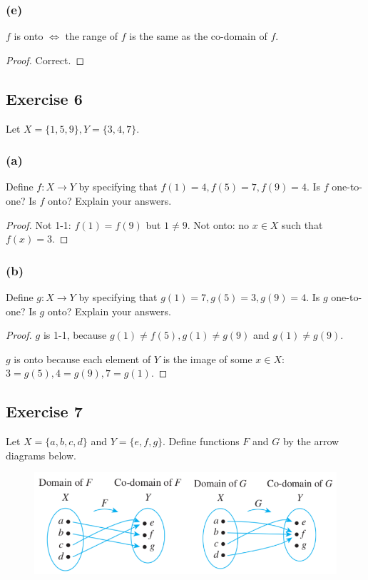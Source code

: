 \documentclass[14pt]{extarticle}
\begin{document}
\subsubsection{(e)}
$f$ is onto $\iff$ the range of $f$ is the same as the co-domain of $f$.

\begin{proof}
Correct.
\end{proof}

\subsection{Exercise 6}
Let \(X = \{1, 5, 9\}, Y = \{3, 4, 7\}\).

\subsubsection{(a)}
Define \(f: X \to Y\) by specifying that \(f(1) = 4, f(5) = 7, f(9) = 4\). Is $f$ one-to-one? Is $f$ onto? 
Explain your answers.

\begin{proof}
Not 1-1: \(f(1) = f(9)\) but \(1 \neq 9\). Not onto: no $x \in X$ such that $f(x) = 3$.
\end{proof}

\subsubsection{(b)}
Define \(g: X \to Y\) by specifying that \(g(1) = 7, g(5) = 3, g(9) = 4\). Is $g$ one-to-one? Is $g$ onto? 
Explain your answers.

\begin{proof}
$g$ is 1-1, because \(g(1) \neq f(5), g(1) \neq g(9)\) and \(g(1) \neq g(9)\).

$g$ is onto because each element of $Y$ is the image of some $x \in X$: \(3 = g(5), 4 = g(9), 7 = g(1)\).
\end{proof}

\subsection{Exercise 7}
Let \(X = \{a, b, c, d\}\) and \(Y = \{e, f, g\}\). Define
functions $F$ and $G$ by the arrow diagrams below.

\begin{figure}[ht!]
\centering
\includegraphics[scale=0.5]{../images/7.2.7.png}
\end{figure}
\end{document}
